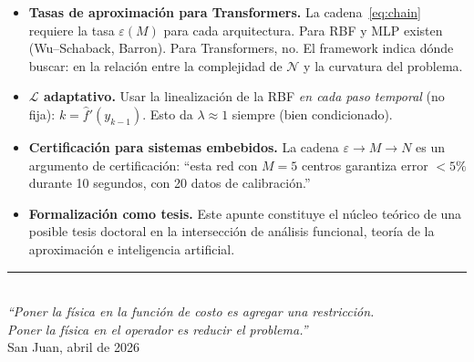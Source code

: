 \documentclass[11pt,a4paper]{article}
\begin{document}
\begin{itemize}
\item \textbf{Tasas de aproximaci\'on para Transformers.} La cadena~\eqref{eq:chain} requiere la tasa $\varepsilon(M)$ para cada arquitectura. Para RBF y MLP existen (Wu--Schaback, Barron). Para Transformers, no. El framework indica d\'onde buscar: en la relaci\'on entre la complejidad de $\mathcal{N}$ y la curvatura del problema.

\item \textbf{$\mathcal{L}$ adaptativo.} Usar la linealizaci\'on de la RBF \emph{en cada paso temporal} (no fija): $k = \hat{f}'(y_{k-1})$. Esto da $\lambda \approx 1$ siempre (bien condicionado).

\item \textbf{Certificaci\'on para sistemas embebidos.} La cadena $\varepsilon \to M \to N$ es un argumento de certificaci\'on: ``esta red con $M=5$ centros garantiza error $< 5\%$ durante 10 segundos, con 20 datos de calibraci\'on.''

\item \textbf{Formalizaci\'on como tesis.} Este apunte constituye el n\'ucleo te\'orico de una posible tesis doctoral en la intersecci\'on de an\'alisis funcional, teor\'ia de la aproximaci\'on e inteligencia artificial.
\end{itemize}

\vfill
\begin{center}
\rule{10cm}{0.4pt}\\[6pt]
\small\textit{``Poner la f\'isica en la funci\'on de costo es agregar una restricci\'on.\\
Poner la f\'isica en el operador es reducir el problema.''}\\[6pt]
\small San Juan, abril de 2026
\end{center}
\end{document}
